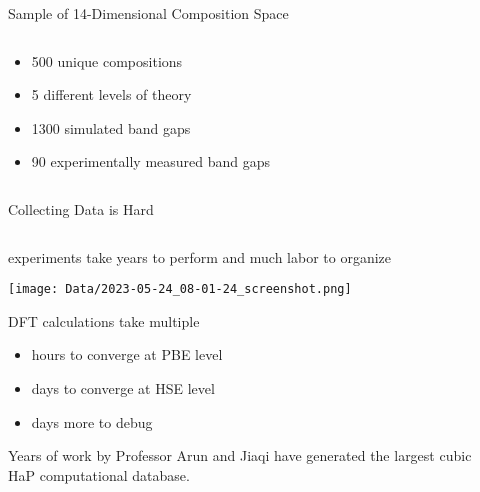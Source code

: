 \documentclass[10pt, aspectratio=169, presentation]{beamer}
\begin{document}
\begin{frame}[label={sec:org3024697}]{Sample of 14-Dimensional Composition Space}
\begin{columns}
\begin{column}{0.5\columnwidth}
\begin{itemize}
\item 500 unique compositions
\item 5 different levels of theory
\item 1300 simulated band gaps
\item 90 experimentally measured band gaps
\end{itemize}

 
\begin{center}

\end{center}
\end{column}

\begin{column}{0.5\columnwidth}
 
\begin{center}

\end{center}
\end{column}
\end{columns}
\end{frame}

\begin{frame}[label={sec:orgbc51b19}]{Collecting Data is Hard}
\begin{columns}
\begin{column}{0.7\columnwidth}
experiments take years to perform and much labor to organize
\autocite{almora-2020-devic-perfor}

\begin{center}
\texttt{[image: Data/2023-05-24\_08-01-24\_screenshot.png]}
\end{center}

\vspace{-0.5cm}DFT calculations take multiple
\begin{itemize}
\item hours to converge at PBE level
\item days to converge at HSE level
\item days more to debug
\end{itemize}
Years of work by Professor Arun and Jiaqi have generated
the largest cubic HaP computational database.\autocite{yang-2023-high-throug}
\end{column}

\begin{column}{0.3\columnwidth}
 
\begin{center}

\end{center}
\end{column}
\end{columns}
\end{frame}
\end{document}
